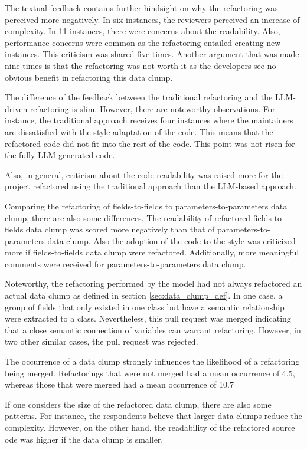 The textual feedback contains further hindsight on why the refactoring was perceived more negatively. In six instances, the reviewers perceived an increase of complexity. In 11 instances, there were concerns about the readability. Also, performance concerns were common as the refactoring entailed creating new instances. This criticism was shared five times. Another argument that was made nine times is that the refactoring was not worth it as the developers see no obvious benefit in refactoring this data clump.

The difference of the feedback between the traditional refactoring and the \ac{LLM}-driven refactoring is slim. However, there are noteworthy observations. For instance, the traditional approach receives four instances where the maintainers are dissatisfied with the style adaptation of  the code. This means that the refactored code did not fit into the rest of the code. This point was not risen for the fully \ac{LLM}-generated code. 

Also, in general, criticism about the code readability was raised more for the project refactored using the traditional approach than the \ac{LLM}-based approach.

Comparing the refactoring of fields-to-fields to parameters-to-parameters data clump, there are also some differences. The readability of refactored fields-to-fields data clump was  scored more negatively than that of parameters-to-parameters data clump. Also the adoption of the code to the style was criticized more if fields-to-fields data clump were refactored. Additionally, more meaningful comments were received for parameters-to-parameters data clump.

Noteworthy, the refactoring performed by the model had not always refactored an actual data clump as defined in section \ref{sec:data_clump_def}. In one case, a group of fields that only existed in one class but have a semantic relationship were extracted to a class. Nevertheless, this pull request was merged indicating that a close semantic connection of variables can warrant refactoring. However, in two other similar cases, the pull request was rejected. 

The occurrence of a data clump strongly influences the likelihood of a refactoring being merged. Refactorings that were not merged had a mean occurrence of 4.5, whereas those that were merged had a mean occurrence of 10.7

If one considers the size of the refactored data clump, there are also some patterns. For instance, the respondents believe that larger data clumps reduce the complexity. However, on the other hand, the readability of the refactored source ode was higher if the data clump is smaller.

